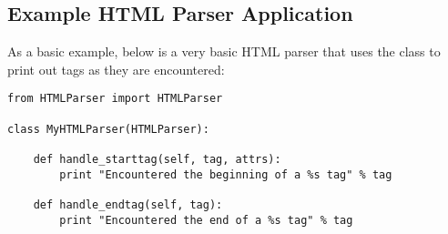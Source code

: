 \subsection{Example HTML Parser Application \label{htmlparser-example}}

As a basic example, below is a very basic HTML parser that uses the
 class to print out tags as they are encountered:

\begin{verbatim}
from HTMLParser import HTMLParser

class MyHTMLParser(HTMLParser):

    def handle_starttag(self, tag, attrs):
        print "Encountered the beginning of a %s tag" % tag

    def handle_endtag(self, tag):
        print "Encountered the end of a %s tag" % tag
\end{verbatim}
